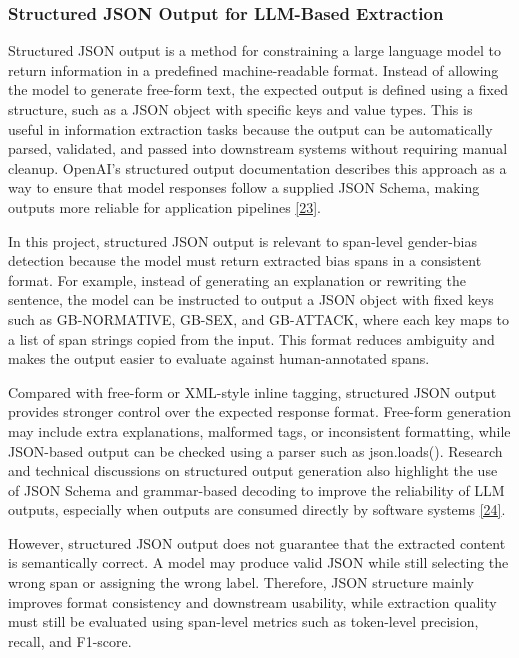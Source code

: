 \documentclass[12pt,oneside,openright,a4paper]{cpe-english-project}
\begin{document}
\subsubsection{Structured JSON Output for LLM-Based Extraction}

Structured JSON output is a method for constraining a large language model to return information in a predefined machine-readable format. Instead of allowing the model to generate free-form text, the expected output is defined using a fixed structure, such as a JSON object with specific keys and value types. This is useful in information extraction tasks because the output can be automatically parsed, validated, and passed into downstream systems without requiring manual cleanup. OpenAI's structured output documentation describes this approach as a way to ensure that model responses follow a supplied JSON Schema, making outputs more reliable for application pipelines \hyperlink{bib:ref23}{[23]}.

In this project, structured JSON output is relevant to span-level gender-bias detection because the model must return extracted bias spans in a consistent format. For example, instead of generating an explanation or rewriting the sentence, the model can be instructed to output a JSON object with fixed keys such as GB-NORMATIVE, GB-SEX, and GB-ATTACK, where each key maps to a list of span strings copied from the input. This format reduces ambiguity and makes the output easier to evaluate against human-annotated spans.

Compared with free-form or XML-style inline tagging, structured JSON output provides stronger control over the expected response format. Free-form generation may include extra explanations, malformed tags, or inconsistent formatting, while JSON-based output can be checked using a parser such as json.loads(). Research and technical discussions on structured output generation also highlight the use of JSON Schema and grammar-based decoding to improve the reliability of LLM outputs, especially when outputs are consumed directly by software systems \hyperlink{bib:ref24}{[24]}.

However, structured JSON output does not guarantee that the extracted content is semantically correct. A model may produce valid JSON while still selecting the wrong span or assigning the wrong label. Therefore, JSON structure mainly improves format consistency and downstream usability, while extraction quality must still be evaluated using span-level metrics such as token-level precision, recall, and F1-score.
\end{document}
